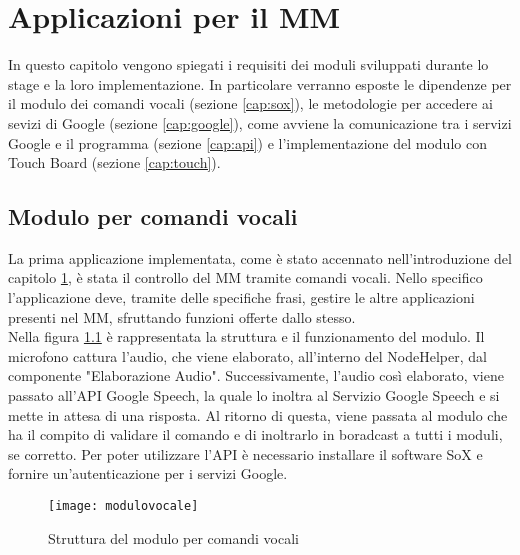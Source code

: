 \chapter{Applicazioni per il MM}\label{capitolo4}
In questo capitolo vengono spiegati i requisiti dei moduli sviluppati durante lo stage e la loro implementazione.
In particolare verranno esposte le dipendenze per il modulo dei comandi vocali (sezione \ref{cap:sox}), le metodologie
per accedere ai sevizi di Google (sezione \ref{cap:google}), come avviene la comunicazione tra i servizi Google e il programma (sezione \ref{cap:api})
e l'implementazione del modulo con Touch Board (sezione \ref{cap:touch}).

\section{Modulo per comandi vocali}\label{cap:voce}
La prima applicazione implementata, come \`e stato accennato nell'introduzione del capitolo \ref{capitolo4}, \`e
stata il controllo del MM tramite comandi vocali.
Nello specifico l'applicazione deve, tramite delle specifiche frasi,
gestire le altre applicazioni presenti nel MM, sfruttando funzioni offerte dallo stesso.\\
Nella figura \ref{fig:modulovocale} \`e rappresentata la struttura e il funzionamento del modulo.
Il microfono cattura l'audio, che viene elaborato, all'interno del NodeHelper, dal componente "Elaborazione Audio".
Successivamente, l'audio cos\`i elaborato, viene
passato all'API Google Speech, la quale lo inoltra al Servizio Google Speech e si mette in attesa di una risposta.
Al ritorno di questa, viene passata al modulo che ha il compito di validare il comando e di inoltrarlo in boradcast a tutti i moduli, se
corretto.
Per poter utilizzare l'API \`e necessario installare il software SoX e fornire un'autenticazione per i servizi Google.

\begin{figure}[H]
    \texttt{[image: modulovocale]}
    \caption{Struttura del modulo per comandi vocali}
    \label{fig:modulovocale}
\end{figure}

